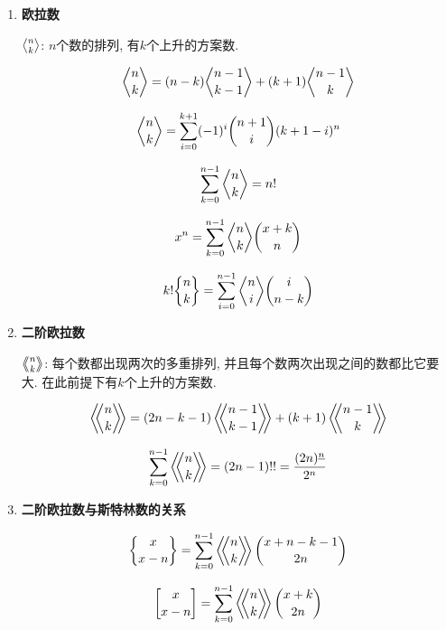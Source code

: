 \def \bangle{ \atopwithdelims \langle \rangle}

\begin{enumerate}

\item \textbf{欧拉数}

${n\bangle k}$: $n$个数的排列, 有$k$个上升的方案数.

$$ {n\bangle k} = (n - k){n - 1 \bangle k - 1} + (k + 1){n - 1 \bangle k} $$

$$ {n\bangle k} = \sum_{i = 0} ^ {k + 1} (-1)^i {n + 1\choose i} (k + 1 - i)^n $$

$$ \sum_{k = 0} ^ {n - 1} {n\bangle k} = n! $$

$$ x^n = \sum_{k = 0} ^ {n - 1} {n\bangle k} {x+k \choose n} $$

$$ k!{n\brace k} = \sum_{i = 0} ^ {n - 1} {n\bangle i} {i\choose n - k} $$

\item \textbf{二阶欧拉数}

$\left\langle\!\!{n\bangle k}\!\!\right\rangle$: 每个数都出现两次的多重排列, 并且每个数两次出现之间的数都比它要大. 在此前提下有$k$个上升的方案数.

$$ \left\langle\!\!{n\bangle k}\!\!\right\rangle = (2n-k-1)\left\langle\!\!{n-1\bangle k-1}\!\!\right\rangle + (k+1)\left\langle\!\!{n-1 \bangle k}\!\!\right\rangle $$

$$ \sum_{k = 0} ^ {n - 1} \left\langle\!\!{n\bangle k}\!\!\right\rangle = (2n-1)!! = \frac{(2n)^{\underline n}} {2^n} $$

\item \textbf{二阶欧拉数与斯特林数的关系}

$$ {x \brace x-n} = \sum_{k = 0} ^ {n - 1} \left\langle\!\!{n\bangle k}\!\!\right\rangle {x + n - k - 1 \choose 2n} $$

$$ {x \brack x-n} = \sum_{k = 0} ^ {n - 1} \left\langle\!\!{n\bangle k}\!\!\right\rangle {x + k \choose 2n} $$

\end{enumerate}